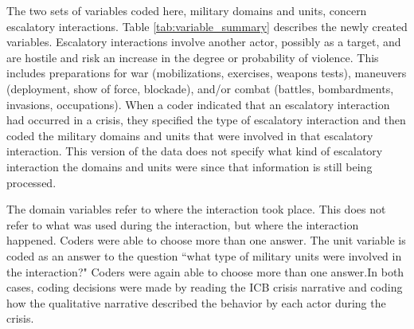 \documentclass[12pt,letterpaper]{article}
\begin{document}
The two sets of variables coded here, military domains and units, concern escalatory interactions. Table \ref{tab:variable_summary} describes the newly created variables. Escalatory interactions involve another actor, possibly as a target, and are hostile and risk an increase in the degree or probability of violence. This includes preparations for war (mobilizations, exercises, weapons tests), maneuvers (deployment, show of force, blockade), and/or combat (battles, bombardments, invasions, occupations). When a coder indicated that an escalatory interaction had occurred in a crisis, they specified the type of escalatory interaction and then coded the military domains and units that were involved in that escalatory interaction. This version of the data does not specify what kind of escalatory interaction the domains and units were since that information is still being processed.

The domain variables refer to where the interaction took place. This does not refer to what was used during the interaction, but where the interaction happened. Coders were able to choose more than one answer. The unit variable is coded as an answer to the question ``what type of military units were involved in the interaction?" Coders were again able to choose more than one answer.In both cases, coding decisions were made by reading the ICB crisis narrative and coding how the qualitative narrative described the behavior by each actor during the crisis.
\end{document}

